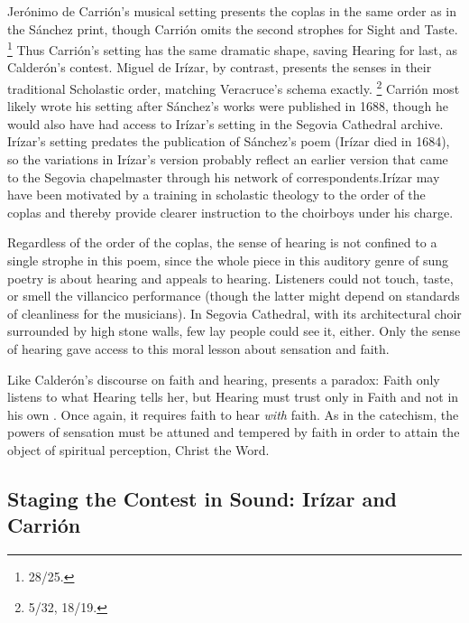 Jerónimo de Carrión's musical setting presents the coplas in the same order as in the Sánchez print, though Carrión omits the second strophes for Sight and Taste.%
  \footnote{\signature{E-SE}{28/25}.}
Thus Carrión's setting has the same dramatic shape, saving Hearing for last, as Calderón's contest.
Miguel de Irízar, by contrast, presents the senses in their traditional Scholastic order, matching Veracruce's schema exactly.%
  \footnote{\signature{E-SE}{5/32, 18/19}.}
Carrión most likely wrote his setting after Sánchez's works were published in 1688, though he would also have had access to Irízar's setting in the Segovia Cathedral archive.
Irízar's setting predates the publication of Sánchez's poem (Irízar died in 1684), so the variations in Irízar's version probably reflect an earlier version that came to the Segovia chapelmaster through his network of correspondents.
Irízar may have been motivated by a training in scholastic theology to  the order of the coplas and thereby provide clearer instruction to the choirboys under his charge.

Regardless of the order of the coplas, the sense of hearing is not confined to a single strophe in this poem, since the whole piece in this auditory genre of sung poetry is about hearing and appeals to hearing.
Listeners could not touch, taste, or smell the villancico performance (though the latter might depend on standards of cleanliness for the musicians).
In Segovia Cathedral, with its architectural choir surrounded by high stone walls, few lay people could see it, either.
Only the sense of hearing gave access to this moral lesson about sensation and faith.

Like Calderón's discourse on faith and hearing,  presents a paradox: Faith only listens to what Hearing tells her, but Hearing must trust only in Faith and not in his own .
Once again, it requires faith to hear  \emph{with} faith.
As in the catechism, the powers of sensation must be attuned and tempered by faith in order to attain the object of spiritual perception, Christ the Word.

\subsection{Staging the Contest in Sound: Irízar and Carrión}


